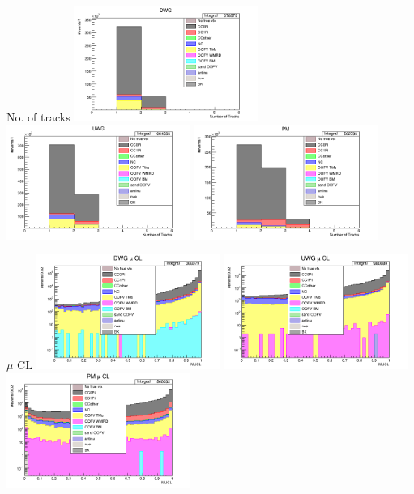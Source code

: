 \documentclass[%
 reprint,
 amsmath,amssymb,
 aps,
]{revtex4-2}
\begin{document}
\begin{frame}{No. of tracks}
    \includegraphics[width=0.45\textwidth]{images/num_of_vtx_reco_tracks_wgbm_topo_DWG_accum_level[][26]_data_mc.png}
    \includegraphics[width=0.45\textwidth]{images/num_of_vtx_reco_tracks_wgbm_topo_UWG_accum_level[][16]_data_mc.png}
    \includegraphics[width=0.45\textwidth]{images/num_of_vtx_reco_tracks_wgbm_topo_PM_accum_level[][06]_data_mc.png}
\end{frame}

\begin{frame}{$\mu$ CL}
    \includegraphics[width=0.45\textwidth]{images/mucl_dwg_wgbm_topo_DWG_accum_level[][26]_data_mc.png}
    \includegraphics[width=0.45\textwidth]{images/mucl_uwg_wgbm_topo_UWG_accum_level[][16]_data_mc.png}
    \includegraphics[width=0.45\textwidth]{images/mucl_pm_wgbm_topo_PM_accum_level[][06]_data_mc.png}
    \end{frame}
\end{document}
